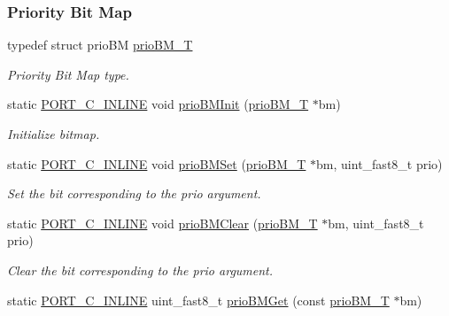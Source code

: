 \subsubsection*{Priority Bit Map}
\begin{DoxyCompactItemize}
\item 
typedef struct prio\-B\-M \hyperlink{group__kern__impl_gacd0176b76efe8eb30f7f4f3928afe256}{prio\-B\-M\-\_\-\-T}
\begin{DoxyCompactList}\small\item\em Priority Bit Map type. \end{DoxyCompactList}\item 
static \hyperlink{group__template__compiler_ga87952d6e574c7f437503926e833ba345}{P\-O\-R\-T\-\_\-\-C\-\_\-\-I\-N\-L\-I\-N\-E} void \hyperlink{group__kern__impl_gad7d7d37b75a64e9e5d8cd11c90aead11}{prio\-B\-M\-Init} (\hyperlink{group__kern__impl_gacd0176b76efe8eb30f7f4f3928afe256}{prio\-B\-M\-\_\-\-T} $\ast$bm)
\begin{DoxyCompactList}\small\item\em Initialize bitmap. \end{DoxyCompactList}\item 
static \hyperlink{group__template__compiler_ga87952d6e574c7f437503926e833ba345}{P\-O\-R\-T\-\_\-\-C\-\_\-\-I\-N\-L\-I\-N\-E} void \hyperlink{group__kern__impl_ga9f61fb23090012bfd439a6f95f06a011}{prio\-B\-M\-Set} (\hyperlink{group__kern__impl_gacd0176b76efe8eb30f7f4f3928afe256}{prio\-B\-M\-\_\-\-T} $\ast$bm, uint\-\_\-fast8\-\_\-t prio)
\begin{DoxyCompactList}\small\item\em Set the bit corresponding to the prio argument. \end{DoxyCompactList}\item 
static \hyperlink{group__template__compiler_ga87952d6e574c7f437503926e833ba345}{P\-O\-R\-T\-\_\-\-C\-\_\-\-I\-N\-L\-I\-N\-E} void \hyperlink{group__kern__impl_gaa42c02d556d0449ef990a088d0a1accb}{prio\-B\-M\-Clear} (\hyperlink{group__kern__impl_gacd0176b76efe8eb30f7f4f3928afe256}{prio\-B\-M\-\_\-\-T} $\ast$bm, uint\-\_\-fast8\-\_\-t prio)
\begin{DoxyCompactList}\small\item\em Clear the bit corresponding to the prio argument. \end{DoxyCompactList}\item 
static \hyperlink{group__template__compiler_ga87952d6e574c7f437503926e833ba345}{P\-O\-R\-T\-\_\-\-C\-\_\-\-I\-N\-L\-I\-N\-E} uint\-\_\-fast8\-\_\-t \hyperlink{group__kern__impl_gacd2270a57fb5dd534a8238274728332d}{prio\-B\-M\-Get} (const \hyperlink{group__kern__impl_gacd0176b76efe8eb30f7f4f3928afe256}{prio\-B\-M\-\_\-\-T} $\ast$bm)

\end{DoxyCompactItemize}
